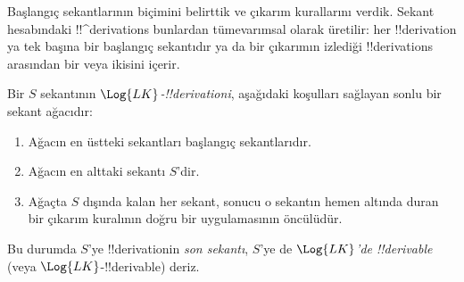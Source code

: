 \documentclass[../../../include/open-logic-section]{subfiles}
\begin{document}
      {}
      {}


\begin{explain}
Başlangıç sekantlarının biçimini belirttik ve çıkarım kurallarını verdik.
Sekant hesabındaki !!^{derivation}s bunlardan tümevarımsal olarak üretilir:
her !!{derivation} ya tek başına bir başlangıç sekantıdır ya da bir çıkarımın
izlediği !!{derivation}s arasından bir veya ikisini içerir.
\end{explain}

\begin{defn}
Bir $S$ sekantının \emph{$\Log{LK}$-!!{derivation}{}i}, aşağıdaki koşulları
sağlayan sonlu bir sekant ağacıdır:
\begin{enumerate}
\item Ağacın en üstteki sekantları başlangıç sekantlarıdır.
\item Ağacın en alttaki sekantı $S$'dir.
\item Ağaçta $S$ dışında kalan her sekant, sonucu o sekantın hemen altında
  duran bir çıkarım kuralının doğru bir uygulamasının öncülüdür.
\end{enumerate}
Bu durumda $S$'ye !!{derivation}{}in \emph{son sekantı}, $S$'ye de
\emph{$\Log{LK}$'de !!{derivable}} (veya $\Log{LK}$-!!{derivable}) deriz.
\end{defn}
\end{document}
